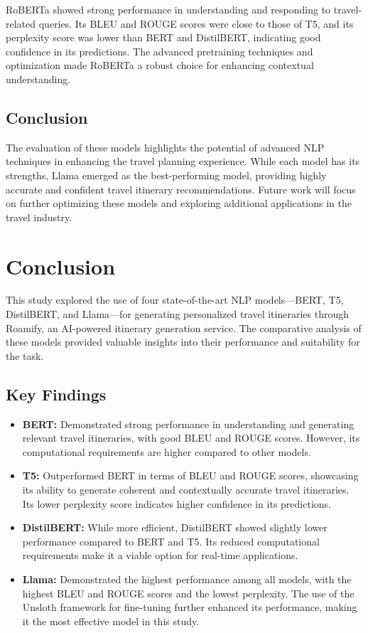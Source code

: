 \documentclass[conference]{IEEEtran}
\begin{document}
RoBERTa showed strong performance in understanding and responding to travel-related queries. Its BLEU and ROUGE scores were close to those of T5, and its perplexity score was lower than BERT and DistilBERT, indicating good confidence in its predictions. The advanced pretraining techniques and optimization made RoBERTa a robust choice for enhancing contextual understanding.

\subsection{Conclusion}

The evaluation of these models highlights the potential of advanced NLP techniques in enhancing the travel planning experience. While each model has its strengths, Llama emerged as the best-performing model, providing highly accurate and confident travel itinerary recommendations. Future work will focus on further optimizing these models and exploring additional applications in the travel industry.





\section{Conclusion}

This study explored the use of four state-of-the-art NLP models—BERT, T5, DistilBERT, and Llama—for generating personalized travel itineraries through Roamify, an AI-powered itinerary generation service. The comparative analysis of these models provided valuable insights into their performance and suitability for the task.

\subsection{Key Findings}

\begin{itemize}
    \item \textbf{BERT:} Demonstrated strong performance in understanding and generating relevant travel itineraries, with good BLEU and ROUGE scores. However, its computational requirements are higher compared to other models.
    \item \textbf{T5:} Outperformed BERT in terms of BLEU and ROUGE scores, showcasing its ability to generate coherent and contextually accurate travel itineraries. Its lower perplexity score indicates higher confidence in its predictions.
    \item \textbf{DistilBERT:} While more efficient, DistilBERT showed slightly lower performance compared to BERT and T5. Its reduced computational requirements make it a viable option for real-time applications.
    \item \textbf{Llama:} Demonstrated the highest performance among all models, with the highest BLEU and ROUGE scores and the lowest perplexity. The use of the Unsloth framework for fine-tuning further enhanced its performance, making it the most effective model in this study.
\end{itemize}
\end{document}
